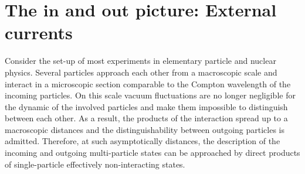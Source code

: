 \documentclass[
12pt, %
english, %
singlespacing, %
headsepline, %
]{MastersDoctoralThesis} %
\begin{document}
\section{The $ \pmb{in} $ and $ \pmb{out}$ picture: External currents}\label{in_out_picture_external_currents}
Consider the set-up of most experiments in elementary particle and nuclear physics. Several particles approach each other from a macroscopic scale and interact in a microscopic section comparable to the Compton wavelength of the incoming particles. On this scale vacuum fluctuations are no longer negligible for the dynamic of the involved particles and make them impossible to distinguish between each other. As a result, the products of the interaction spread up to a macroscopic distances and the distinguishability between outgoing particles is admitted. Therefore, at such asymptotically distances, the description of the incoming and outgoing multi-particle states can be approached by direct products of single-particle effectively non-interacting states.
\end{document}
